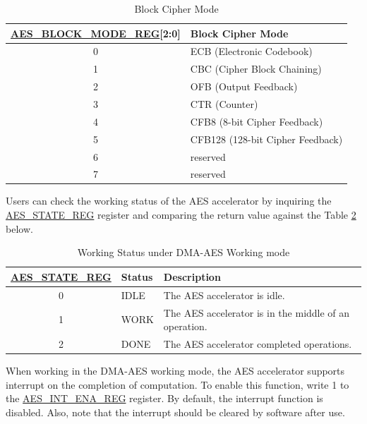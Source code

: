 \documentclass[main\_\_EN.tex]{subfiles}
\begin{document}
\begin{longtable}[c]{ | c | l | }
\caption{Block Cipher Mode}
\label{tab:aes-block-mode}
\\\hline
\rowcolor{lightgray}
\textbf{\hyperref[regdesc:AESBLOCKMODEREG]{AES\_BLOCK\_MODE\_REG}[2:0]}     & \textbf{Block Cipher Mode}\\
    \hline
    0                          & ECB (Electronic Codebook)    \\
    \hline
    1                          & CBC (Cipher Block Chaining)     \\
    \hline
    2                          & OFB (Output Feedback)    \\
    \hline
    3                          & CTR (Counter)    \\
    \hline
    4                          & CFB8 (8-bit Cipher Feedback)    \\
    \hline
    5                          & CFB128 (128-bit Cipher Feedback) \\
    \hline
    6                         & reserved \\
    \hline
    7                         & reserved \\
    \hline
\end{longtable}

Users can check the working status of the AES accelerator by inquiring the \hyperref[regdesc:AESSTATEREG]{AES\_STATE\_REG} register and comparing the return value against the Table \ref{tab:aes-state-value-dma} below.

\begin{longtable}[c]{ | c | l | l | }
\caption{Working Status under DMA-AES Working mode}
\label{tab:aes-state-value-dma}
\\\hline
\rowcolor{lightgray}
\textbf{\hyperref[regdesc:AESSTATEREG]{AES\_STATE\_REG}} & \textbf{Status} &  \textbf{Description} \\ \hline

    0                   & IDLE      &   The AES accelerator is idle.\\ \hline
    1                   & WORK      &   The AES accelerator is in the middle of an operation.     \\ \hline
    2                   & DONE      &   The AES accelerator completed operations.     \\ \hline
\end{longtable}

When working in the DMA-AES working mode, the AES accelerator supports interrupt on the completion of computation. To enable this function, write 1 to the \hyperref[regdesc:AESINTENAREG]{AES\_INT\_ENA\_REG} register. By default, the interrupt function is disabled. Also, note that the interrupt should be cleared by software after use.
\end{document}
